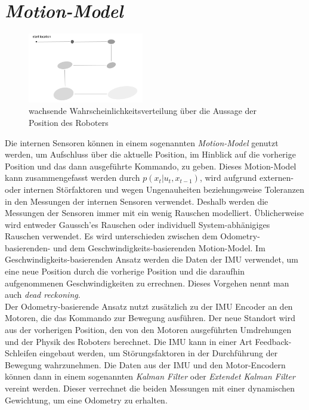 \section{\textit{Motion-Model}}\label{sec:Motion-Model}
\begin{figure}
    \centering
    \includegraphics[width=0.45\textwidth]{pic/vorwissen/3b_growinguncertainty.png}
    \caption{wachsende Wahrscheinlichkeitsverteilung über die Aussage der Position des Roboters}
    \label{fig:3b_growing_uncertainty}
\end{figure}
Die internen Sensoren können in einem sogenannten \textit{Motion-Model} genutzt werden, um Aufschluss über die aktuelle Position, im Hinblick auf die vorherige Position und das dann ausgeführte Kommando, zu geben. Dieses Motion-Model kann zusammengefasst werden durch $p(x_t|u_t, x_{t-1})$, wird aufgrund externen- oder internen Störfaktoren und wegen Ungenauheiten beziehungsweise Toleranzen in den Messungen der internen Sensoren verwendet. Deshalb werden die Messungen der Sensoren immer mit ein wenig Rauschen modelliert. Üblicherweise wird entweder Gaussch'es Rauschen oder individuell System-abhänigiges Rauschen verwendet. Es wird unterschieden zwischen dem Odometry-basierenden- und dem Geschwindigkeits-basierenden Motion-Model. Im Geschwindigkeits-basierenden Ansatz werden die Daten der IMU verwendet, um eine neue Position durch die vorherige Position und die daraufhin aufgenommenen Geschwindigkeiten zu errechnen. Dieses Vorgehen nennt man auch \textit{dead reckoning}.\\
Der Odometry-basierende Ansatz nutzt zusätzlich zu der IMU Encoder an den Motoren, die das Kommando zur Bewegung ausführen. Der neue Standort wird aus der vorherigen Position, den von den Motoren ausgeführten Umdrehungen und der Physik des Roboters berechnet. Die IMU kann in einer Art Feedback-Schleifen eingebaut werden, um Störungsfaktoren in der Durchführung der Bewegung wahrzunehmen. Die Daten aus der IMU und den Motor-Encodern können dann in einem sogenannten \textit{Kalman Filter} oder \textit{Extendet Kalman Filter} vereint werden. Dieser verrechnet die beiden Messungen mit einer dynamischen Gewichtung, um eine Odometry zu erhalten.\\
